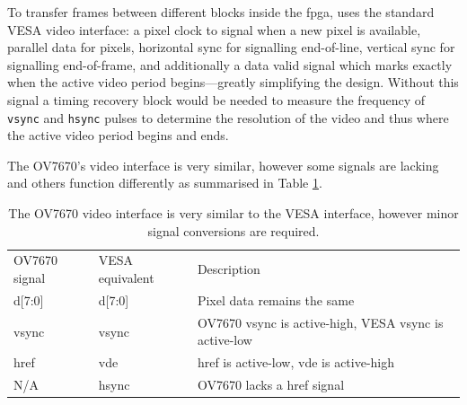 To transfer frames between different blocks inside the \gls{fpga}, uses the standard VESA video interface: a pixel clock to signal when a new pixel is available, parallel data for pixels, horizontal sync for signalling end-of-line, vertical sync for signalling end-of-frame, and additionally a data valid signal which marks exactly when the active video period begins---greatly simplifying the design. Without this signal a timing recovery block would be needed to measure the frequency of \texttt{vsync} and \texttt{hsync} pulses to determine the resolution of the video and thus where the active video period begins and ends.

The OV7670's video interface is very similar, however some signals are lacking and others function differently as summarised in Table \ref{table:ov7670_video_interface}. 

\begin{table}
  \begin{tabular}{lll}
  OV7670 signal   & VESA equivalent & Description                                           \\
  d[7:0]          & d[7:0]          & Pixel data remains the same                           \\
  vsync           & vsync           & OV7670 vsync is active-high, VESA vsync is active-low \\
  href            & vde             & href is active-low, vde is active-high                \\
  N/A             & hsync           & OV7670 lacks a href signal
  \end{tabular}
  \caption{The OV7670 video interface is very similar to the VESA interface, however minor signal conversions are required.}
  \label{table:ov7670_video_interface}
\end{table}